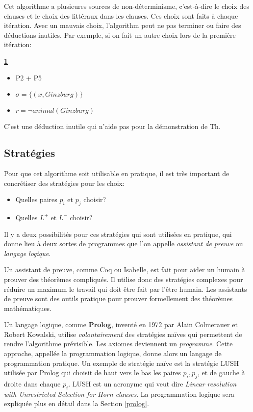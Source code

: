 {Cet algorithme a plusieures sources de non-déterminisme, c'est-à-dire
le choix des clauses et le choix des littéraux dans les clauses.
Ces choix sont faits à chaque itération.
Avec un mauvais choix, l'algorithm peut ne pas terminer ou
faire des déductions inutiles.
Par exemple, si on fait un autre choix lors de la première itération:

\textbf{\underline{1}}
\begin{itemize}
  \item P2 + P5
  \item $\sigma = \big\{ (x, Ginzburg) \big\}$
  \item $r = \neg animal(Ginzburg)$
\end{itemize}

C'est une déduction inutile qui n'aide pas pour la démonstration de $\mathrm{Th}$.

\subsection{Stratégies}

Pour que cet algorithme soit utilisable en pratique, il est très important
de concrétiser des stratégies pour les choix:
\begin{itemize}
  \item Quelles paires $p_i$ et $p_j$ choisir?
  \item Quelles $L^{+}$ et $L^{-}$ choisir?
\end{itemize}
Il y a deux possibilités pour ces stratégies qui sont utilisées en pratique,
qui donne lieu à deux sortes de programmes que l'on appelle {\em assistant de preuve}
ou {\em langage logique}.

Un assistant de preuve, comme Coq ou Isabelle, est fait pour aider un humain à prouver des théorèmes compliqués.
Il utilise donc des stratégies complexes pour réduire un maximum le travail qui doit
être fait par l'être humain.
Les assistants de preuve sont des outils pratique pour prouver formellement des théorèmes mathématiques.

Un langage logique, comme \textbf{Prolog}, inventé en 1972 par Alain Colmerauer et Robert Kowalski,
utilise {\em volontairement} des stratégies naïves qui permettent de rendre l'algorithme prévisible.
Les axiomes deviennent un {\em programme}.
Cette approche, appellée la programmation logique, donne alors un langage de programmation pratique.
Un exemple de stratégie naïve est la stratégie LUSH utilisée par Prolog
qui choisit de haut vers le bas les paires $p_i, p_j$,
et de gauche à droite dans chaque $p_i$.
LUSH est un acronyme qui veut dire {\em Linear resolution with Unrestricted Selection for Horn clauses}.
La programmation logique sera expliquée plus en détail dans la Section \ref{prolog}.

}

